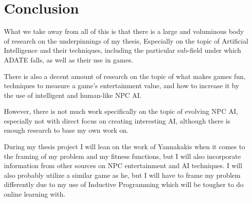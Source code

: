\documentclass[]{report}
\begin{document}
\chapter{Conclusion}
\label{cha:conclusion}

What we take away from all of this is that there is a large and voluminous
body of research on the underpinnings of my thesis, Especially on the topic of
Artificial Intelligence and their techniques, including the particular sub-field
under which ADATE falls, as well as their use in games.

There is also a decent amount of research on the topic of what makes games fun,
techniques to measure a game's entertainment value, and how to increase it by
the use of intelligent and human-like NPC AI.

However, there is not much work specifically on the topic of evolving NPC AI,
especially not with direct focus on creating interesting AI, although there is
enough research to base my own work on.

During my thesis project I will lean on the work of Yannakakis when it comes to
the framing of my problem and my fitness functions, but I will also incorporate
information from other sources on NPC entertainment and AI techniques. I will
also probably utilize a similar game as he, but I will have to frame my problem
differently due to my use of Inductive Programming which will be tougher to do
online learning with.



\end{document}
